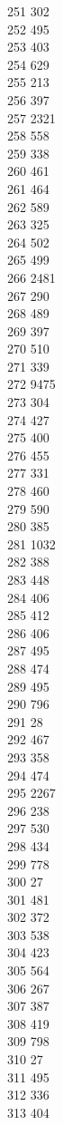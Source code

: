 { 251	302 \\
 252	495 \\
 253	403 \\
 254	629 \\
 255	213 \\
 256	397 \\
 257	2321 \\
 258	558 \\
 259	338 \\
 260	461 \\
 261	464 \\
 262	589 \\
 263	325 \\
 264	502 \\
 265	499 \\
 266	2481 \\
 267	290 \\
 268	489 \\
 269	397 \\
 270	510 \\
 271	339 \\
 272	9475 \\
 273	304 \\
 274	427 \\
 275	400 \\
 276	455 \\
 277	331 \\
 278	460 \\
 279	590 \\
 280	385 \\
 281	1032 \\
 282	388 \\
 283	448 \\
 284	406 \\
 285	412 \\
 286	406 \\
 287	495 \\
 288	474 \\
 289	495 \\
 290	796 \\
 291	28 \\
 292	467 \\
 293	358 \\
 294	474 \\
 295	2267 \\
 296	238 \\
 297	530 \\
 298	434 \\
 299	778 \\
 300	27 \\
 301	481 \\
 302	372 \\
 303	538 \\
 304	423 \\
 305	564 \\
 306	267 \\
 307	387 \\
 308	419 \\
 309	798 \\
 310	27 \\
 311	495 \\
 312	336 \\
 313	404 \\
}
